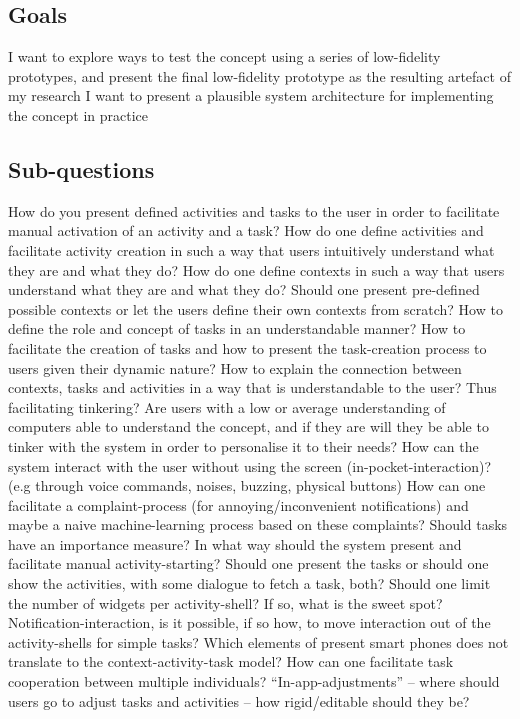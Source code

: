 \subsection{Goals}
I want to explore ways to test the concept using a series of low-fidelity prototypes, and present the final low-fidelity prototype as the resulting artefact of my research
I want to present a plausible system architecture for implementing the concept in practice

\subsection{Sub-questions}
How do you present defined activities and tasks to the user in order to facilitate manual activation of an activity and a task?
How do one define activities and facilitate activity creation in such a way that users intuitively understand what they are and what they do?
How do one define contexts in such a way that users understand what they are and what they do?
Should one present pre-defined possible contexts or let the users define their own contexts from scratch?
How to define the role and concept of tasks in an understandable manner?
How to facilitate the creation of tasks and how to present the task-creation process to users given their dynamic nature?
How to explain the connection between contexts, tasks and activities in a way that is understandable to the user?
Thus facilitating tinkering?
Are users with a low or average understanding of computers able to understand the concept, and if they are will they be able to tinker with the system in order to personalise it to their needs?
How can the system interact with the user without using the screen (in-pocket-interaction)? (e.g through voice commands, noises, buzzing, physical buttons)
How can one facilitate a complaint-process (for annoying/inconvenient notifications) and maybe a naive machine-learning process based on these complaints?
Should tasks have an importance measure?
In what way should the system present and facilitate manual activity-starting?
Should one present the tasks or should one show the activities, with some dialogue to fetch a task, both?
Should one limit the number of widgets per activity-shell? If so, what is the sweet spot?
Notification-interaction, is it possible, if so how, to move interaction out of the activity-shells for simple tasks?
Which elements of present smart phones does not translate to the context-activity-task model?
How can one facilitate task cooperation between multiple individuals?
“In-app-adjustments” – where should users go to adjust tasks and activities – how rigid/editable should they be?
